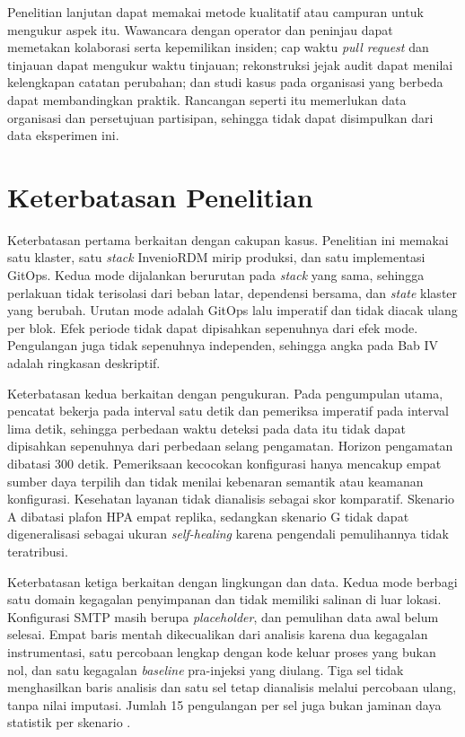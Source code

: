 Penelitian lanjutan dapat memakai metode kualitatif atau campuran untuk mengukur aspek itu. Wawancara dengan operator dan peninjau dapat memetakan kolaborasi serta kepemilikan insiden; cap waktu \textit{pull request} dan tinjauan dapat mengukur waktu tinjauan; rekonstruksi jejak audit dapat menilai kelengkapan catatan perubahan; dan studi kasus pada organisasi yang berbeda dapat membandingkan praktik. Rancangan seperti itu memerlukan data organisasi dan persetujuan partisipan, sehingga tidak dapat disimpulkan dari data eksperimen ini.

\section{Keterbatasan Penelitian}
\label{sec:keterbatasan}

Keterbatasan pertama berkaitan dengan cakupan kasus. Penelitian ini memakai satu klaster, satu \textit{stack} InvenioRDM mirip produksi, dan satu implementasi GitOps. Kedua mode dijalankan berurutan pada \textit{stack} yang sama, sehingga perlakuan tidak terisolasi dari beban latar, dependensi bersama, dan \textit{state} klaster yang berubah. Urutan mode adalah GitOps lalu imperatif dan tidak diacak ulang per blok. Efek periode tidak dapat dipisahkan sepenuhnya dari efek mode. Pengulangan juga tidak sepenuhnya independen, sehingga angka pada Bab IV adalah ringkasan deskriptif.

Keterbatasan kedua berkaitan dengan pengukuran. Pada pengumpulan utama, pencatat bekerja pada interval satu detik dan pemeriksa imperatif pada interval lima detik, sehingga perbedaan waktu deteksi pada data itu tidak dapat dipisahkan sepenuhnya dari perbedaan selang pengamatan. Horizon pengamatan dibatasi 300 detik. Pemeriksaan kecocokan konfigurasi hanya mencakup empat sumber daya terpilih dan tidak menilai kebenaran semantik atau keamanan konfigurasi. Kesehatan layanan tidak dianalisis sebagai skor komparatif. Skenario A dibatasi plafon HPA empat replika, sedangkan skenario G tidak dapat digeneralisasi sebagai ukuran \textit{self-healing} karena pengendali pemulihannya tidak teratribusi.

Keterbatasan ketiga berkaitan dengan lingkungan dan data. Kedua mode berbagi satu domain kegagalan penyimpanan dan tidak memiliki salinan di luar lokasi. Konfigurasi SMTP masih berupa \textit{placeholder}, dan pemulihan data awal belum selesai. Empat baris mentah dikecualikan dari analisis karena dua kegagalan instrumentasi, satu percobaan lengkap dengan kode keluar proses yang bukan nol, dan satu kegagalan \textit{baseline} pra-injeksi yang diulang. Tiga sel tidak menghasilkan baris analisis dan satu sel tetap dianalisis melalui percobaan ulang, tanpa nilai imputasi. Jumlah 15 pengulangan per sel juga bukan jaminan daya statistik per skenario \citep{dyba2006power,kitchenham2024small}.

